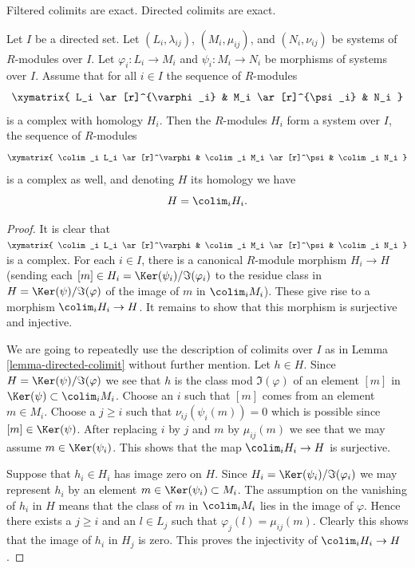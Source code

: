 \begin{lemma}
\label{lemma-directed-colimit-exact}
\begin{slogan}
Filtered colimits are exact. Directed colimits are exact.
\end{slogan}
Let $I$ be a directed set.
Let $(L_i, \lambda_{ij})$, $(M_i, \mu_{ij})$, and
$(N_i, \nu_{ij})$ be systems of $R$-modules over $I$.
Let $\varphi_i : L_i \to M_i$ and $\psi_i : M_i \to N_i$ be
morphisms of systems over $I$. Assume that for all $i \in I$ the
sequence of $R$-modules
$$
\xymatrix{
L_i \ar[r]^{\varphi_i} &
M_i \ar[r]^{\psi_i} &
N_i
}
$$
is a complex with homology $H_i$.
Then the $R$-modules $H_i$ form a system over $I$,
the sequence of $R$-modules
$$
\xymatrix{
\colim_i L_i \ar[r]^\varphi &
\colim_i M_i \ar[r]^\psi &
\colim_i N_i
}
$$
is a complex as well, and denoting $H$ its homology we have
$$
H = \colim_i H_i.
$$
\end{lemma}

\begin{proof}
It is clear that
$
\xymatrix{
\colim_i L_i \ar[r]^\varphi &
\colim_i M_i \ar[r]^\psi &
\colim_i N_i
}
$
is a complex. For each $i \in I$, there is a canonical
$R$-module morphism $H_i \to H$ (sending each
$[m] \in H_i = \Ker(\psi_i) / \Im(\varphi_i)$ to the
residue class in $H = \Ker(\psi) / \Im(\varphi)$
of the image of $m$ in $\colim_i M_i$). These give rise
to a morphism $\colim_i H_i \to H$. It remains to
show that this morphism is surjective and injective.

\medskip\noindent
We are going to repeatedly use the description of colimits over $I$
as in Lemma \ref{lemma-directed-colimit} without further mention.
Let $h \in H$.
Since $H = \Ker(\psi)/\Im(\varphi)$ we see that
$h$ is the class mod $\Im(\varphi)$ of an element $[m]$
in $\Ker(\psi) \subset \colim_i M_i$. Choose an
$i$ such that $[m]$ comes from an element $m \in M_i$. Choose
a $j \geq i$ such that $\nu_{ij}(\psi_i(m)) = 0$ which is possible
since $[m] \in \Ker(\psi)$. After replacing $i$ by $j$ and
$m$ by $\mu_{ij}(m)$ we see that we may assume $m \in \Ker(\psi_i)$.
This shows that the map $\colim_i H_i \to H$ is surjective.

\medskip\noindent
Suppose that $h_i \in H_i$ has image zero on $H$. Since
$H_i = \Ker(\psi_i)/\Im(\varphi_i)$ we may represent
$h_i$ by an element $m \in \Ker(\psi_i) \subset M_i$.
The assumption on the vanishing of $h_i$ in $H$ means that
the class of $m$ in $\colim_i M_i$ lies in the image
of $\varphi$. Hence there exists a $j \geq i$ and an $l \in L_j$
such that $\varphi_j(l) = \mu_{ij}(m)$. Clearly this shows that
the image of $h_i$ in $H_j$ is zero. This proves the
injectivity of $\colim_i H_i \to H$.
\end{proof}

